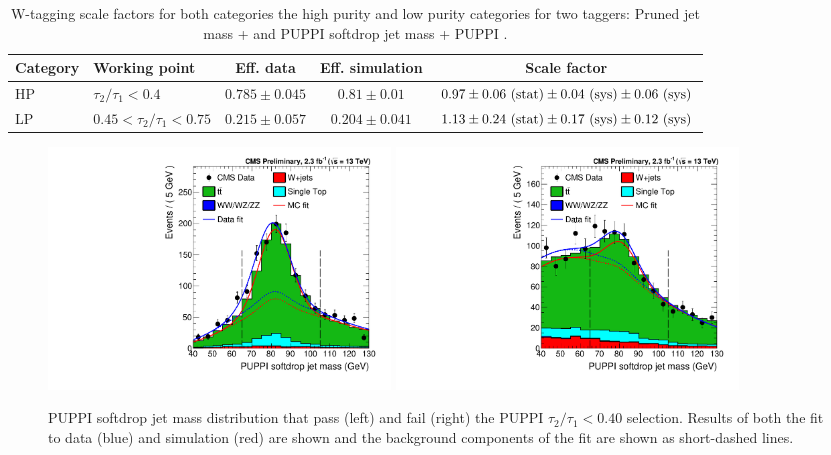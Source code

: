\begin{table}[h!]
   \centering
   \footnotesize
   \begin{tabular}{|l|l|c|c|c|}
   \hline
   Category & Working point & Eff. data & Eff. simulation & Scale factor\\
   \hline
   HP& $\tau_2 / \tau_1 < 0.4$         & $0.785 \pm 0.045 $& $0.81 \pm 0.01$   &$0.97 \pm 0.06~\rm{(stat)} \pm 0.04~\rm{(sys)} \pm 0.06~\rm{(sys)}$\\
   LP& $0.45 < \tau_2 / \tau_1 < 0.75$ & $0.215 \pm 0.057 $& $0.204 \pm 0.041$ &$1.13 \pm 0.24~\rm{(stat)} \pm 0.17~\rm{(sys)}  \pm 0.12~\rm{(sys)}$\\
   \hline
   \end{tabular}
   \caption{W-tagging scale factors for both categories the high purity and low purity categories for two taggers: Pruned jet mass + \nsubj and PUPPI softdrop jet mass + PUPPI \nsubj. }
   \label{tab:searchII:WtagSFs}
\end{table}


\begin{figure}[h!]
\centering
\includegraphics[width=0.44\textwidth]{figures/vtagging/AN-16-215/_HP0v40powheg_76X_PuppiSD_em_pTbin_200_5000.pdf}
\includegraphics[width=0.44\textwidth]{figures/vtagging/AN-16-215/_HP0v40powheg_76X_PuppiSD_em_fail_pTbin_200_5000.pdf}\\
\caption{PUPPI softdrop jet mass distribution that pass (left) and fail (right) the PUPPI $\tau_2 / \tau_1 < 0.40$ selection. Results of both the fit to data (blue) and simulation (red) are shown and the background components of the fit are shown as short-dashed lines.}
\label{fig:searchII:simfit}
\end{figure}

